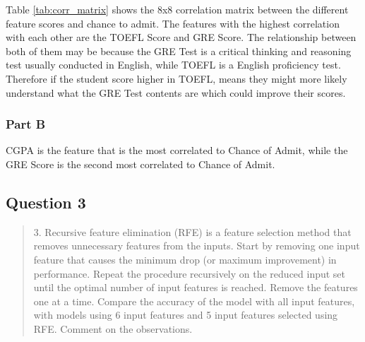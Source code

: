 Table \ref{tab:corr_matrix} shows the 8x8 correlation matrix between the different feature scores and chance to admit. The features with the highest correlation with each other are the TOEFL Score and GRE Score. The relationship between both of them may be because the GRE Test is a critical thinking and reasoning test usually conducted in English, while TOEFL is a English proficiency test. Therefore if the student score higher in TOEFL, means they might more likely understand what the GRE Test contents are which could improve their scores.

\subsubsection{Part B}
CGPA is the feature that is the most correlated to Chance of Admit, while the GRE Score is the second most correlated to Chance of Admit.

\subsection{Question 3}
\label{2q3}
\begin{quote}
3. Recursive feature elimination (RFE) is a feature selection method that removes unnecessary features from the inputs. Start by removing one input feature that causes the minimum drop (or maximum improvement) in performance. Repeat the procedure recursively on the reduced input set until the optimal number of input features is reached. Remove the features one at a time. Compare the accuracy of the model with all input features, with models using 6 input features and 5 input features selected using RFE. Comment on the observations.
\end{quote}
